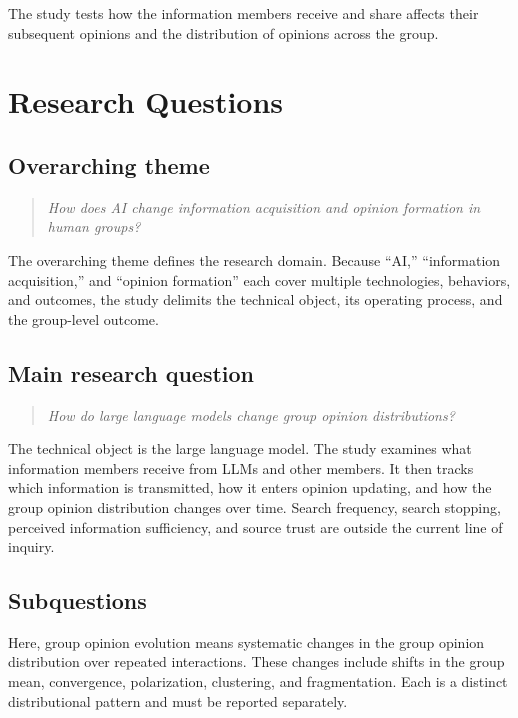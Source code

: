\documentclass[11pt,a4paper]{article}
\begin{document}
The study tests how the information members receive and share affects their subsequent opinions and the distribution of opinions across the group.

\section{Research Questions}

\subsection{Overarching theme}

\begin{quote}\itshape
How does AI change information acquisition and opinion formation in human groups?
\end{quote}

The overarching theme defines the research domain. Because ``AI,'' ``information acquisition,'' and ``opinion formation'' each cover multiple technologies, behaviors, and outcomes, the study delimits the technical object, its operating process, and the group-level outcome.

\subsection{Main research question}

\begin{quote}\itshape
How do large language models change group opinion distributions?
\end{quote}

The technical object is the large language model. The study examines what information members receive from LLMs and other members. It then tracks which information is transmitted, how it enters opinion updating, and how the group opinion distribution changes over time. Search frequency, search stopping, perceived information sufficiency, and source trust are outside the current line of inquiry.

\subsection{Subquestions}

Here, group opinion evolution means systematic changes in the group opinion distribution over repeated interactions. These changes include shifts in the group mean, convergence, polarization, clustering, and fragmentation. Each is a distinct distributional pattern and must be reported separately.
\end{document}
